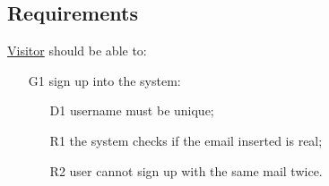 \subsection{Requirements}

\underline{Visitor} should be able to:
\begin{itemize}
\item[G1] sign up into the system:
	\begin{itemize}
	\item[D1] username must be unique;
	\newline
	\item[R1] the system checks if the email inserted is real;
	\item[R2] user cannot sign up with the same mail twice.
	\end{itemize}
\end{itemize}

